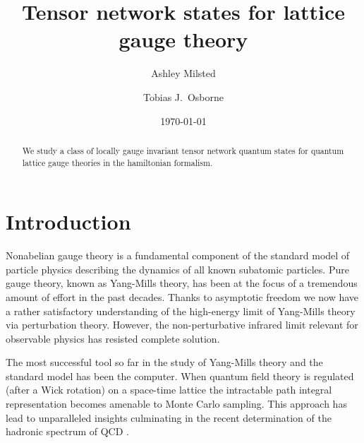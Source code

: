 \documentclass[12pt]{amsart}
\theoremstyle{definition}
\theoremstyle{remark}
\numberwithin{equation}{section}
\begin{document}
%

\title[TNS for lattice gauge theory]{Tensor network states for lattice gauge theory}

\author{Ashley Milsted}
\address{Leibniz Universit\"at Hannover, Institute of Theoretical Physics, Appelstra{\ss}e 2, D-30167 Hannover, Germany}
\author{Tobias J.\ Osborne}
\address{Leibniz Universit\"at Hannover, Institute of Theoretical Physics, Appelstra{\ss}e 2, D-30167 Hannover, Germany}

\date{\today}

\begin{abstract}
	We study a class of locally gauge invariant tensor network quantum states for quantum lattice gauge theories in the hamiltonian formalism. 
\end{abstract}

\maketitle

\section{Introduction}

Nonabelian gauge theory is a fundamental component of the standard model of particle physics describing the dynamics of all known subatomic particles. Pure gauge theory, known as Yang-Mills theory, has been at the focus of a tremendous amount of effort in the past decades. Thanks to asymptotic freedom we now have a rather satisfactory understanding of the high-energy limit of Yang-Mills theory via perturbation theory. However, the non-perturbative infrared limit relevant for observable physics has resisted complete solution.

The most successful tool so far in the study of Yang-Mills theory and the standard model has been the computer. When quantum field theory is regulated (after a Wick rotation) on a space-time lattice \cites{wilson:1974b, creutz:1985a} the intractable path integral representation becomes amenable to Monte Carlo sampling. This approach has lead to unparalleled insights culminating in the recent determination of the hadronic spectrum of QCD \cite{duerr:2008a}. 
\end{document}
